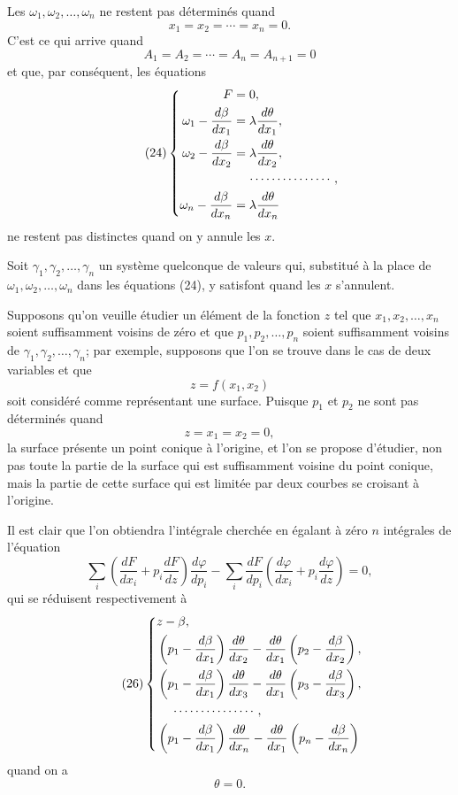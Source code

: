 \documentclass[11pt]{article}
\begin{document}
Les $\omega_1,\omega_2,\ldots,\omega_n$ ne restent pas déterminés quand
\[
x_1=x_2=\cdots=x_n=0.
\]
C’est ce qui arrive quand
\[
A_1=A_2=\cdots=A_n=A_{n+1}=0
\]
et que, par conséquent, les équations
\begin{equation*}\tag{24}
\left\{
\begin{aligned}
F&=0,\\
\omega_1-\frac{d\beta}{dx_1}&=\lambda\frac{d\theta}{dx_1},\\
\omega_2-\frac{d\beta}{dx_2}&=\lambda\frac{d\theta}{dx_2},\\
&\hspace{1.2em}\cdots\cdots\cdots\cdots\cdots,\\
\omega_n-\frac{d\beta}{dx_n}&=\lambda\frac{d\theta}{dx_n}
\end{aligned}
\right.
\end{equation*}
ne restent pas distinctes quand on y annule les $x$.

Soit $\gamma_1,\gamma_2,\ldots,\gamma_n$ un système quelconque de valeurs qui, substitué à la place de $\omega_1,\omega_2,\ldots,\omega_n$ dans les équations (24), y satisfont quand les $x$ s’annulent.

Supposons qu’on veuille étudier un élément de la fonction $z$ tel que $x_1,x_2,\ldots,x_n$ soient suffisamment voisins de zéro et que $p_1,p_2,\ldots,p_n$ soient suffisamment voisins de $\gamma_1,\gamma_2,\ldots,\gamma_n$; par exemple, supposons que l’on se trouve dans le cas de deux variables et que
\[
z=f(x_1,x_2)
\]
soit considéré comme représentant une surface. Puisque $p_1$ et $p_2$ ne sont pas déterminés quand
\[
z=x_1=x_2=0,
\]
la surface présente un point conique à l’origine, et l’on se propose d’étudier, non pas toute la partie de la surface qui est suffisamment voisine du point conique, mais la partie de cette surface qui est limitée par deux courbes se croisant à l’origine.

Il est clair que l’on obtiendra l’intégrale cherchée en égalant à zéro $n$ intégrales de l’équation
\begin{equation*}\tag{25}
\sum_i\left(\frac{dF}{dx_i}+p_i\frac{dF}{dz}\right)\frac{d\varphi}{dp_i}
-
\sum_i\frac{dF}{dp_i}\left(\frac{d\varphi}{dx_i}+p_i\frac{d\varphi}{dz}\right)=0,
\end{equation*}
qui se réduisent respectivement à
\begin{equation*}\tag{26}
\left\{
\begin{aligned}
&z-\beta,\\
&\left(p_1-\frac{d\beta}{dx_1}\right)\frac{d\theta}{dx_2}
-\frac{d\theta}{dx_1}\left(p_2-\frac{d\beta}{dx_2}\right),\\
&\left(p_1-\frac{d\beta}{dx_1}\right)\frac{d\theta}{dx_3}
-\frac{d\theta}{dx_1}\left(p_3-\frac{d\beta}{dx_3}\right),\\
&\hspace{1.2em}\cdots\cdots\cdots\cdots\cdots,\\
&\left(p_1-\frac{d\beta}{dx_1}\right)\frac{d\theta}{dx_n}
-\frac{d\theta}{dx_1}\left(p_n-\frac{d\beta}{dx_n}\right)
\end{aligned}
\right.
\end{equation*}
quand on a
\[
\theta=0.
\]
\end{document}
